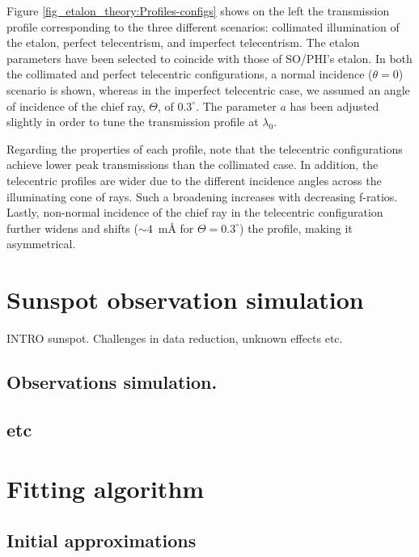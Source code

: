 Figure \ref{fig_etalon_theory:Profiles-configs} shows on the left the transmission profile corresponding to the three different scenarios: collimated illumination of the etalon, perfect telecentrism, and imperfect telecentrism. The etalon parameters have been selected to coincide with those of SO/PHI's etalon. In both the collimated and perfect telecentric configurations, a normal incidence  ($\theta = 0$) scenario is shown, whereas in the imperfect telecentric case, we assumed an angle of incidence of the chief ray, $\Theta$, of $0.3^{\circ}$. The parameter $a$ has been adjusted slightly in order to tune the transmission profile at $\lambda _ 0$. 

Regarding the properties of each profile, note that the telecentric configurations achieve lower peak transmissions than the collimated case. In addition, the telecentric profiles are wider due to the different incidence angles across the illuminating cone of rays. Such a broadening increases with decreasing f-ratios. Lastly, non-normal incidence of the chief ray in the telecentric configuration further widens and shifts ($\sim 4$~m\r{A}
for $\Theta=0.3^\circ$) the profile, making it asymmetrical. 

\section{Sunspot observation simulation}
INTRO sunspot. Challenges in data reduction, unknown effects etc. 

\subsection{Observations simulation.}

\subsection{etc}


\section{Fitting algorithm}
\subsection{\label{eta_corr_susec: etalon_transmission}Initial approximations}

